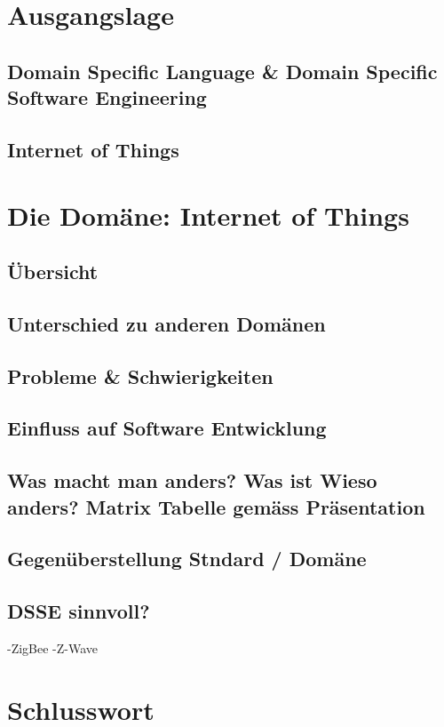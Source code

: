 \chapter{Ausgangslage}
\section{Domain Specific Language \& Domain Specific Software Engineering}

\section{Internet of Things}

\chapter{Die Domäne: Internet of Things}
\section{Übersicht}

\section{Unterschied zu anderen Domänen}

\section{Probleme \& Schwierigkeiten}

\section{Einfluss auf Software Entwicklung}
\section{Was macht man anders? Was ist Wieso anders? Matrix Tabelle  gemäss Präsentation}

\section{Gegenüberstellung Stndard / Domäne}

\section{DSSE sinnvoll?}

-ZigBee
-Z-Wave



\chapter{Schlusswort}


